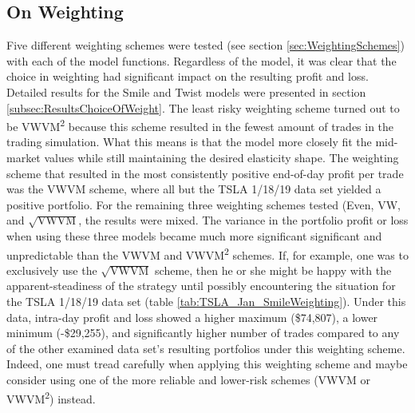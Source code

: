 \documentclass[12pt, a4paper, notitlepage]{article}
\numberwithin{equation}{subsection}
\numberwithin{figure}{subsection}
\numberwithin{table}{subsection}
\newcommand{\newpar}{\newline \newline}
\begin{document}
\subsection{On Weighting}
Five different weighting schemes were tested (see section \ref{sec:WeightingSchemes}) with each of the model functions.  Regardless of the model, it was clear that the choice in weighting had significant impact on the resulting profit and loss.  Detailed results for the Smile and Twist models were presented in section \ref{subsec:ResultsChoiceOfWeight}.
\newpar
The least risky weighting scheme turned out to be VWVM\textsuperscript{2} because this scheme resulted in the fewest amount of trades in the trading simulation.  What this means is that the model more closely fit the mid-market values while still maintaining the desired elasticity shape.  The weighting scheme that resulted in the most consistently positive end-of-day profit per trade was the VWVM scheme, where all but the TSLA 1/18/19 data set yielded a positive portfolio.
\newpar
For the remaining three weighting schemes tested (Even, VW, and $\sqrt{\text{VWVM}}$, the results were mixed.  The variance in the portfolio profit or loss when using these three models became much more significant significant and unpredictable than the VWVM and VWVM\textsuperscript{2} schemes.  If, for example, one was to exclusively use the $\sqrt{\text{VWVM}}$ scheme, then he or she might be happy with the apparent-steadiness of the strategy until possibly encountering the situation for the TSLA 1/18/19 data set (table \ref{tab:TSLA_Jan_SmileWeighting}).  Under this data, intra-day profit and loss showed a higher maximum (\$74,807), a lower minimum (-\$29,255), and significantly higher number of trades compared to any of the other examined data set's resulting portfolios under this weighting scheme.  Indeed, one must tread carefully when applying this weighting scheme and maybe consider using one of the more reliable and lower-risk schemes (VWVM or VWVM\textsuperscript{2}) instead.
\end{document}
